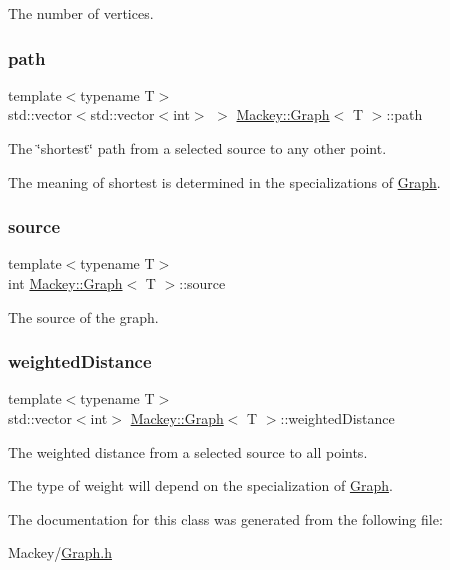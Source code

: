 The number of vertices. 

\mbox{\label{classMackey_1_1Graph_a66fac95e623ca6e3e85ec33310755831}} 
\subsubsection{\texorpdfstring{path}{path}}
{\footnotesize\ttfamily template$<$typename T$>$ \\
std\+::vector$<$std\+::vector$<$int$>$ $>$ \hyperlink{classMackey_1_1Graph}{Mackey\+::\+Graph}$<$ T $>$\+::path}



The \char`\"{}shortest\char`\"{} path from a selected source to any other point. 

The meaning of shortest is determined in the specializations of \hyperlink{classMackey_1_1Graph}{Graph}. \mbox{\label{classMackey_1_1Graph_a43657a07a21a2dcf422876400360ed5b}} 
\subsubsection{\texorpdfstring{source}{source}}
{\footnotesize\ttfamily template$<$typename T$>$ \\
int \hyperlink{classMackey_1_1Graph}{Mackey\+::\+Graph}$<$ T $>$\+::source\hspace{0.3cm}{\ttfamily [protected]}}



The source of the graph. 

\mbox{\label{classMackey_1_1Graph_ab14d4c1bcbe1a994d28a6c590b27ba8b}} 
\subsubsection{\texorpdfstring{weighted\+Distance}{weightedDistance}}
{\footnotesize\ttfamily template$<$typename T$>$ \\
std\+::vector$<$int$>$ \hyperlink{classMackey_1_1Graph}{Mackey\+::\+Graph}$<$ T $>$\+::weighted\+Distance}



The weighted distance from a selected source to all points. 

The type of weight will depend on the specialization of \hyperlink{classMackey_1_1Graph}{Graph}. 

The documentation for this class was generated from the following file\+:\begin{DoxyCompactItemize}
\item 
Mackey/\hyperlink{Graph_8h}{Graph.\+h}\end{DoxyCompactItemize}
